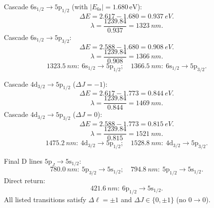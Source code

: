 \documentclass[11pt]{article}
\begin{document}
Cascade $6\mathrm{s}_{1/2}\to 5\mathrm{p}_{1/2}$ (with $|E_{6\mathrm{s}}|=1.680\,\mathrm{eV}$):
\begin{equation}
\Delta E=2.617-1.680=\SI{0.937}{eV}.
\end{equation}
\begin{equation}
\lambda=\frac{1239.84}{0.937}=\SI{1323}{nm}.
\end{equation}
Cascade $6\mathrm{s}_{1/2}\to 5\mathrm{p}_{3/2}$:
\begin{equation}
\Delta E=2.588-1.680=\SI{0.908}{eV}.
\end{equation}
\begin{equation}
\lambda=\frac{1239.84}{0.908}=\SI{1366}{nm}.
\end{equation}
\begin{equation}
\boxed{\;\SI{1323.5}{nm}:\ 6\mathrm{s}_{1/2}\to 5\mathrm{p}_{1/2};\quad \SI{1366.5}{nm}:\ 6\mathrm{s}_{1/2}\to 5\mathrm{p}_{3/2}.\;}
\end{equation}

Cascade $4\mathrm{d}_{3/2}\to 5\mathrm{p}_{1/2}$ ($\Delta J=-1$):
\begin{equation}
\Delta E=2.617-1.773=\SI{0.844}{eV}.
\end{equation}
\begin{equation}
\lambda=\frac{1239.84}{0.844}=\SI{1469}{nm}.
\end{equation}
Cascade $4\mathrm{d}_{3/2}\to 5\mathrm{p}_{3/2}$ ($\Delta J=0$):
\begin{equation}
\Delta E=2.588-1.773=\SI{0.815}{eV}.
\end{equation}
\begin{equation}
\lambda=\frac{1239.84}{0.815}=\SI{1521}{nm}.
\end{equation}
\begin{equation}
\boxed{\;\SI{1475.2}{nm}:\ 4\mathrm{d}_{3/2}\to 5\mathrm{p}_{1/2};\quad \SI{1528.8}{nm}:\ 4\mathrm{d}_{3/2}\to 5\mathrm{p}_{3/2}.\;}
\end{equation}

Final D lines $5\mathrm{p}_{J}\to 5\mathrm{s}_{1/2}$:
\begin{equation}
\boxed{\;\SI{780.0}{nm}:\ 5\mathrm{p}_{3/2}\to 5\mathrm{s}_{1/2};\quad \SI{794.8}{nm}:\ 5\mathrm{p}_{1/2}\to 5\mathrm{s}_{1/2}.\;}
\end{equation}
Direct return:
\begin{equation}
\boxed{\;\SI{421.6}{nm}:\ 6\mathrm{p}_{1/2}\to 5\mathrm{s}_{1/2}.\;}
\end{equation}
All listed transitions satisfy $\Delta\ell=\pm 1$ and $\Delta J\in\{0,\pm 1\}$ (no $0\to 0$).
\end{document}

